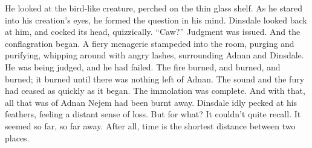 \SmallVSpace
He looked at the bird-like creature, perched on the thin glass shelf. As he stared into his creation’s eyes, he formed the question in his mind. Dinsdale looked back at him, and cocked its head, quizzically.
\SmallVSpace
“Caw?”
\SmallVSpace
Judgment was issued. And the conflagration began. A fiery menagerie stampeded into the room, purging and purifying, whipping around with angry lashes, surrounding Adnan and Dinsdale. He was being judged, and he had failed. The fire burned, and burned, and burned; it burned until there was nothing left of Adnan. The sound and the fury had ceased as quickly as it began.
\SomeVSpace
The immolation was complete. And with that, all that was of Adnan Nejem had been burnt away.
\SmallVSpace
Dinsdale idly pecked at his feathers, feeling a distant sense of loss. But for what? It couldn’t quite recall. It seemed so far, so far away. After all, time is the shortest distance between two places.
\simpleline
{}

